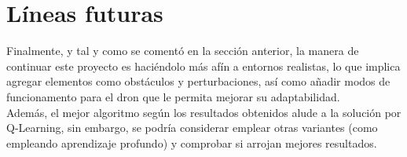 \section{Líneas futuras}
\label{sec:lineas_futuras}

Finalmente, y tal y como se comentó en la sección anterior, la manera de continuar este proyecto es haciéndolo más afín a entornos realistas, lo que implica agregar elementos como obstáculos y perturbaciones, así como añadir modos de funcionamento para el dron que le permita mejorar su adaptabilidad.\\

Además, el mejor algoritmo según los resultados obtenidos alude a la solución por Q-Learning, sin embargo, se podría considerar emplear otras variantes (como empleando aprendizaje profundo) y comprobar si arrojan mejores resultados.